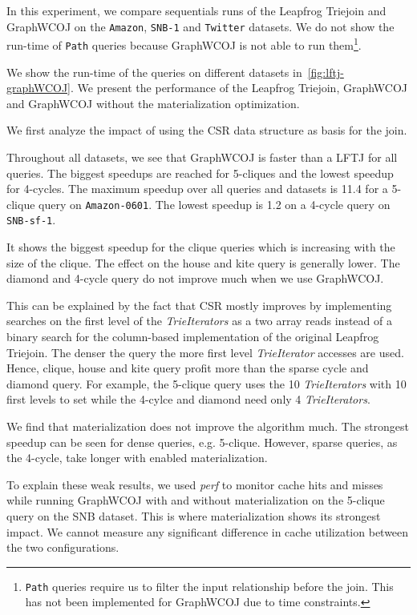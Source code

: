 In this experiment, we compare sequentials runs of the Leapfrog Triejoin and GraphWCOJ
on the \texttt{Amazon}, \texttt{SNB-1} and \texttt{Twitter} datasets.
We do not show the run-time of \texttt{Path} queries because GraphWCOJ is not able to run
them\footnote{\texttt{Path} queries require us to filter the input relationship before
the join. This has not been implemented for GraphWCOJ due to time constraints.}.

We show the run-time of the queries on different datasets in~\cref{fig:lftj-graphWCOJ}.
We present the performance of the Leapfrog Triejoin, GraphWCOJ and GraphWCOJ without the
materialization optimization.

We first analyze the impact of using the \textsc{CSR} data structure as basis for the join.

Throughout all datasets, we see that GraphWCOJ is faster than a \textsc{LFTJ} for all queries.
The biggest speedups are reached for 5-cliques and the lowest speedup for 4-cycles.
The maximum speedup over all queries and datasets is 11.4 for a 5-clique query on \texttt{Amazon-0601}.
The lowest speedup is 1.2 on a 4-cycle query on \texttt{SNB-sf-1}.

It shows the biggest speedup for the clique queries which is increasing with the size of the clique.
The effect on the house and kite query is generally lower.
The diamond and 4-cycle query do not improve much when we use GraphWCOJ.

This can be explained by the fact that \textsc{CSR} mostly improves by implementing searches on
the first level of the \textit{TrieIterators} as a two array reads instead of a binary search for
the column-based implementation of the original Leapfrog Triejoin.
The denser the query the more first level \textit{TrieIterator} accesses are used.
Hence, clique, house and kite query profit more than the sparse cycle and diamond query.
For example, the 5-clique query uses the 10 \textit{TrieIterators} with 10 first levels to set while
the 4-cylce and diamond need only 4 \textit{TrieIterators}.

We find that materialization does not improve the algorithm much.
The strongest speedup can be seen for dense queries, e.g. 5-clique.
However, sparse queries, as the 4-cycle, take longer with enabled materialization.

To explain these weak results, we used \textit{perf} to monitor cache hits and misses while running
GraphWCOJ with and without materialization on the 5-clique query on the SNB dataset.
This is where materialization shows its strongest impact.
We cannot measure any significant difference in cache utilization between the two configurations.

